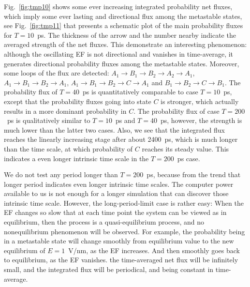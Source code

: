 \documentclass[aip,jcp,a4paper,preprint,onecolumn]{revtex4-1}
\begin{document}
Fig.~\ref{fig:tmp10} shows some ever increasing
integrated probability net fluxes, which imply some ever lasting and directional
flux among the metastable states, see
Fig.~\ref{fig:tmp11} that presents a schematic plot of the main probability
fluxes for $T=10$~ps.
The thickness of the arrow and the number nearby indicate
the averaged strength of the net fluxes.
This demonstrate an interesting phenomenon: although
the oscillating EF is not directional and vanishes in time-average,
it generates directional probability fluxes among the metastable states.
Moreover, some loops of the flux are detected: $A_1 \rightarrow B_1
\rightarrow B_2 \rightarrow A_2 \rightarrow A_1$, $A_1 \rightarrow B_1
\rightarrow B_2 \rightarrow A_1$,  $A_1 \rightarrow B_1
\rightarrow B_2 \rightarrow C \rightarrow A_1$ and $B_1
\rightarrow B_2 \rightarrow C \rightarrow B_1$.
The probability flux of $T=40$~ps is quantitatively
comparable to case $T=10$~ps, except that the probability fluxes
going into state $C$ is stronger, which actually results in
a more dominant probability in $C$.
The probability flux of case $T=200$~ps is qualitatively
similar to $T=10$~ps and $T=40$~ps, however,
the strength is much lower than the latter two cases.
Also, we see that the integrated flux reaches the linearly increasing
stage after about 2400~ps, which is much longer than the time scale,
at which probability of $C$ reaches its steady value. This indicates
a even longer intrinsic time scale in the $T=200$~ps case.

We do not test any period longer than $T=200$~ps, because
from the trend that longer period indicates even longer intrinsic time scales.
The computer power available to us is not enough for a longer
simulation that can discover those intrinsic time scale.
However, the long-period-limit case is rather easy: When
the EF changes so slow that at each time point the system
can be viewed as in equilibrium, then the process is a quasi-equilibrium
process, and no nonequilibrium phenomenon will be observed. For example,
the probability being in a  metastable state will change
smoothly from equilibrium value to the new equilibrium of $E=1$~V/nm, as
the EF increases.
And then smoothly goes back to equilibrium, as the EF vanishes.
the time-averaged net flux will be infinitely small,
and the integrated flux will be periodical, and being constant in time-average.


\end{document}
